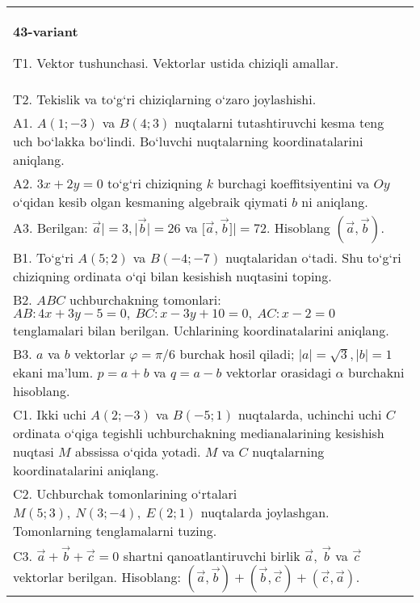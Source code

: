 \documentclass{article}
\begin{document}
\begin{tabular}{m{17cm}}
\textbf{43-variant}
\newline

T1. 
Vektor tushunchasi. Vektorlar ustida chiziqli amallar.
 \\
T2. 
Tekislik va to‘g‘ri chiziqlarning o‘zaro joylashishi.
 \\
A1. 
$A (1;-3) $ va $B (4;3) $ nuqtalarni tutashtiruvchi
kesma teng uch bo‘lakka bo‘lindi. Bo‘luvchi nuqtalarning koordinatalarini
aniqlang.
 \\
A2. 
$3x+2y=0$ to‘g‘ri chiziqning $k$ burchagi
koeffitsiyentini va $Oy$ o‘qidan kesib olgan kesmaning algebraik
qiymati $b$ ni aniqlang.
 \\
A3. 
Berilgan: $\overrightarrow{a}| = 3,|\overrightarrow{b}| = 26$ va
$\lbrack\overrightarrow{a},\overrightarrow{b}\rbrack| = 72$. Hisoblang
$\left(\overrightarrow{a},\overrightarrow{b} \right) $.
 \\
B1. 
To‘g‘ri \(A (5;2) \) va \(B (-4; -7) \) nuqtalaridan o‘tadi.
Shu to‘g‘ri chiziqning ordinata o‘qi bilan kesishish nuqtasini toping.
 \\
B2. 
$ABC$ uchburchakning tomonlari:
\(AB:4x+3y-5=0,\ BC:x-3y+10=0,\ AC:x-2=0\) 
tenglamalari bilan berilgan. Uchlarining koordinatalarini aniqlang.
 \\
B3. 
$a$ va $b$ vektorlar $\varphi = \pi/6$ burchak hosil qiladi; $|a| = \sqrt{3},|b| = 1$ ekani ma’lum. $p = a + b$ va $q = a - b$ vektorlar orasidagi $\alpha$ burchakni hisoblang.
 \\
C1. 
Ikki uchi \(A (2; - 3) \) va \(B (-5;1) \) nuqtalarda,
uchinchi uchi $C$ ordinata o‘qiga tegishli uchburchakning
medianalarining kesishish nuqtasi $M$ abssissa o‘qida yotadi.
$M$ va $C$ nuqtalarning koordinatalarini aniqlang.
 \\
C2. 
Uchburchak tomonlarining o‘rtalari
\(M (5;3),\ N (3; - 4),\ E (2;1) \) nuqtalarda joylashgan. Tomonlarning
tenglamalarni tuzing.
 \\
C3. \(\vec{a} + \vec{b} + \vec{c} = 0\) shartni qanoatlantiruvchi birlik \(\vec{a},\ \vec{b}\) va \(\vec{c}\) vektorlar berilgan. Hisoblang: \(\left(\vec{a},\vec{b} \right) + \left(\vec{b},\vec{c} \right) + \left(\vec{c},\vec{a} \right) \).
 \\

\end{tabular}
\vspace{1cm}
\end{document}
